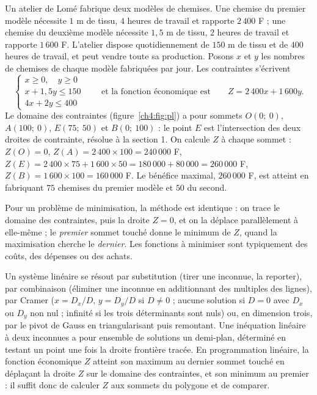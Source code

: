 \begin{exemple}
Un atelier de Lomé fabrique deux modèles de chemises. Une chemise du premier modèle nécessite $1$ m de tissu, $4$ heures de travail et rapporte $2\,400$ F ; une chemise du deuxième modèle nécessite $1{,}5$ m de tissu, $2$ heures de travail et rapporte $1\,600$ F. L'atelier dispose quotidiennement de $150$ m de tissu et de $400$ heures de travail, et peut vendre toute sa production. Posons $x$ et $y$ les nombres de chemises de chaque modèle fabriquées par jour. Les contraintes s'écrivent
\[
\begin{cases}
x \geqslant 0,\quad y \geqslant 0\\
x + 1{,}5y \leqslant 150\\
4x + 2y \leqslant 400
\end{cases}
\qquad\text{et la fonction économique est}\qquad Z = 2\,400x + 1\,600y .
\]
Le domaine des contraintes (figure~\ref{ch4:fig:pl}) a pour sommets $O(0;\ 0)$, $A(100;\ 0)$, $E(75;\ 50)$ et $B(0;\ 100)$ : le point $E$ est l'intersection des deux droites de contrainte, résolue à la section 1. On calcule $Z$ à chaque sommet : $Z(O) = 0$, $Z(A) = 2\,400 \times 100 = 240\,000$ F, $Z(E) = 2\,400 \times 75 + 1\,600 \times 50 = 180\,000 + 80\,000 = 260\,000$ F, $Z(B) = 1\,600 \times 100 = 160\,000$ F. Le bénéfice maximal, $260\,000$ F, est atteint en fabriquant $75$ chemises du premier modèle et $50$ du second.
\end{exemple}

\begin{remarque}
Pour un problème de minimisation, la méthode est identique : on trace le domaine des contraintes, puis la droite $Z = 0$, et on la déplace parallèlement à elle-même ; le \emph{premier} sommet touché donne le minimum de $Z$, quand la maximisation cherche le \emph{dernier}. Les fonctions à minimiser sont typiquement des coûts, des dépenses ou des achats.
\end{remarque}

\begin{aretirer}
Un système linéaire se résout par substitution (tirer une inconnue, la reporter), par combinaison (éliminer une inconnue en additionnant des multiples des lignes), par Cramer ($x = D_{x}/D$, $y = D_{y}/D$ si $D \neq 0$ ; aucune solution si $D = 0$ avec $D_{x}$ ou $D_{y}$ non nul ; infinité si les trois déterminants sont nuls) ou, en dimension trois, par le pivot de Gauss en triangularisant puis remontant. Une inéquation linéaire à deux inconnues a pour ensemble de solutions un demi-plan, déterminé en testant un point une fois la droite frontière tracée. En programmation linéaire, la fonction économique $Z$ atteint son maximum au dernier sommet touché en déplaçant la droite $Z$ sur le domaine des contraintes, et son minimum au premier : il suffit donc de calculer $Z$ aux sommets du polygone et de comparer.
\end{aretirer}
